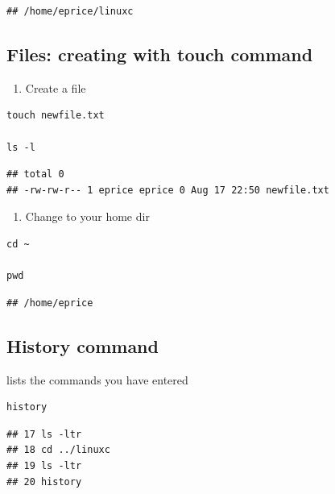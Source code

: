 \documentclass[
]{book}
\providecommand{\tightlist}{%
  \setlength{\itemsep}{0pt}\setlength{\parskip}{0pt}}
\begin{document}
\begin{verbatim}
## /home/eprice/linuxc
\end{verbatim}

\hypertarget{files-creating-with-touch-command}{%
\subsection{Files: creating with touch command}\label{files-creating-with-touch-command}}

\begin{enumerate}
\def\labelenumi{\arabic{enumi})}
\tightlist
\item
  Create a file
\end{enumerate}

\begin{verbatim}
touch newfile.txt

ls -l
\end{verbatim}

\begin{verbatim}
## total 0
## -rw-rw-r-- 1 eprice eprice 0 Aug 17 22:50 newfile.txt
\end{verbatim}

\begin{enumerate}
\def\labelenumi{\arabic{enumi})}
\setcounter{enumi}{1}
\tightlist
\item
  Change to your home dir
\end{enumerate}

\begin{verbatim}
cd ~ 

pwd
\end{verbatim}

\begin{verbatim}
## /home/eprice
\end{verbatim}

\hypertarget{history-command}{%
\subsection{History command}\label{history-command}}

lists the commands you have entered

\begin{verbatim}
history
\end{verbatim}

\begin{verbatim}
## 17 ls -ltr
## 18 cd ../linuxc
## 19 ls -ltr
## 20 history
\end{verbatim}
\end{document}
